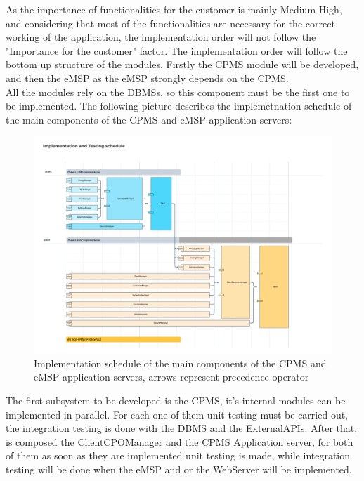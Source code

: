 As the importance of functionalities for the customer is mainly Medium-High, and considering that most of the functionalities are necessary for the correct working of the application, the implementation order will not follow the "Importance for the customer" factor. The implementation order will follow the bottom up structure of the modules. Firstly the CPMS module will be developed, and then the eMSP as the eMSP strongly depends on the CPMS.\\

All the modules rely on the DBMSs, so this component must be the first one to be implemented.
The following picture describes the implemetnation schedule of the main components of the CPMS and eMSP application servers:
\begin{center}
    \begin{figure}[H]
        \includegraphics[width=\textwidth]{./img/ImplementationOrder.png}
        \caption{Implementation schedule of the main components of the CPMS and eMSP application servers, arrows represent precedence operator}
    \end{figure}
\end{center}

The first subsystem to be developed is the CPMS, it's internal modules can be implemented in parallel. For each one of them unit testing must be carried out, the integration testing is done with the DBMS and the ExternalAPIs. After that, is composed the ClientCPOManager and the CPMS Application server, for both of them as soon as they are implemented unit testing is made, while integration testing will be done when the eMSP and or the WebServer will be implemented. \\


